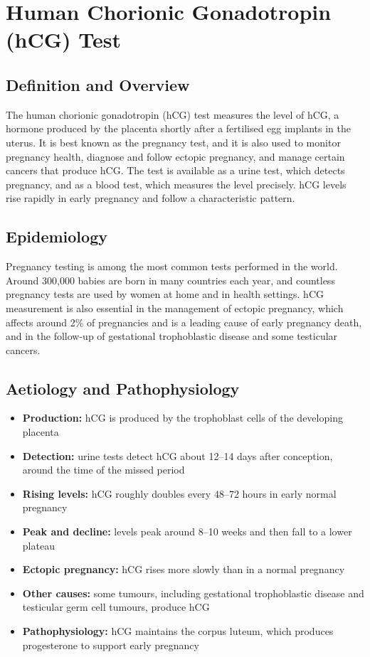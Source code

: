 \chapter{Human Chorionic Gonadotropin (hCG) Test}

\section*{Definition and Overview}
The human chorionic gonadotropin (hCG) test measures the level of hCG, a hormone produced by the placenta shortly after a fertilised egg implants in the uterus. It is best known as the pregnancy test, and it is also used to monitor pregnancy health, diagnose and follow ectopic pregnancy, and manage certain cancers that produce hCG. The test is available as a urine test, which detects pregnancy, and as a blood test, which measures the level precisely. hCG levels rise rapidly in early pregnancy and follow a characteristic pattern.

\section*{Epidemiology}
Pregnancy testing is among the most common tests performed in the world. Around 300,000 babies are born in many countries each year, and countless pregnancy tests are used by women at home and in health settings. hCG measurement is also essential in the management of ectopic pregnancy, which affects around 2\% of pregnancies and is a leading cause of early pregnancy death, and in the follow-up of gestational trophoblastic disease and some testicular cancers.

\section*{Aetiology and Pathophysiology}
\begin{itemize}
    \item \textbf{Production:} hCG is produced by the trophoblast cells of the developing placenta
    \item \textbf{Detection:} urine tests detect hCG about 12--14 days after conception, around the time of the missed period
    \item \textbf{Rising levels:} hCG roughly doubles every 48--72 hours in early normal pregnancy
    \item \textbf{Peak and decline:} levels peak around 8--10 weeks and then fall to a lower plateau
    \item \textbf{Ectopic pregnancy:} hCG rises more slowly than in a normal pregnancy
    \item \textbf{Other causes:} some tumours, including gestational trophoblastic disease and testicular germ cell tumours, produce hCG
    \item \textbf{Pathophysiology:} hCG maintains the corpus luteum, which produces progesterone to support early pregnancy
\end{itemize}

